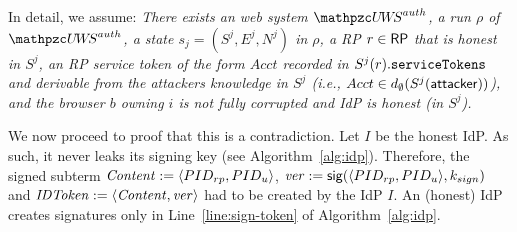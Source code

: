 \documentclass[letterpaper,onecolumn,10pt]{article}
\begin{document}
In detail, we assume: \emph{There exists an \uppresso web system
$\uppressoauthwebsystem$, a run $\rho$ of $\uppressoauthwebsystem$, a
state $s_j = (S^j, E^j, N^j)$ in $\rho$, a RP $r\in \mathsf{RP}$ that is
honest in $S^j$, an RP service token of the form $Acct$
recorded in $S^j(r).\mathtt{serviceTokens}$ and derivable from the
attackers knowledge in $S^j$ (i.e., $Acct \in
d_{\emptyset}(S^j(\mathsf{attacker}))$), and the browser $b$ owning $i$
is not fully corrupted and IdP is honest (in $S^j$).}

We now proceed to proof that this is a contradiction. Let $I$ be the honest IdP. 
As such, it never leaks its signing key (see Algorithm~\ref{alg:idp}). Therefore, 
the signed subterm $\mathit{Content} := \langle {{}PID_{rp}, PID_u} \rangle$, 
$\mathit{ver} := \mathsf{sig}({\langle PID_{rp},PID_u\rangle},{k_{sign}})$ and 
$\mathit{IDToken} := \langle {{}\mathit{Content}, \mathit{ver}} \rangle$ had to be created by the IdP $I$.  
An (honest) IdP creates signatures only in Line~\ref{line:sign-token} of Algorithm~\ref{alg:idp}.
\end{document}
